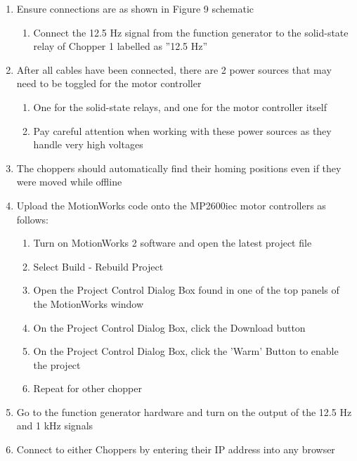 \documentclass{article}
\begin{document}
        \begin{enumerate} [label=\textbf{\arabic*}]
            \item  Ensure connections are as shown in Figure 9 schematic
            \begin{enumerate}
                \item  Connect the 12.5 Hz signal from the function generator to the solid-state relay of Chopper 1 labelled as ”12.5 Hz”
            \end{enumerate}
            \item After all cables have been connected, there are 2 power sources that may need to be toggled for the motor controller
            \begin{enumerate}
                \item One for the solid-state relays, and one for the motor controller itself
                \item Pay careful attention when working with these power sources as they handle very high voltages
            \end{enumerate}
            \item The choppers should automatically find their homing positions even if they were moved while offline
            \item Upload the MotionWorks code onto the MP2600iec motor controllers as follows:
            \begin{enumerate}
                \item Turn on MotionWorks 2 software and open the latest project file
                \item Select Build - Rebuild Project
                \item Open the Project Control Dialog Box found in one of the top panels of the MotionWorks window
                \item On the Project Control Dialog Box, click the Download button
                \item On the Project Control Dialog Box, click the ’Warm’ Button to enable the project
                \item Repeat for other chopper
            \end{enumerate}
            \item Go to the function generator hardware and turn on the output of the 12.5 Hz and 1 kHz signals
             \item Connect to either Choppers by entering their IP address into any browser
            \begin{enumerate}

\end{enumerate}
\end{enumerate}
\end{document}
